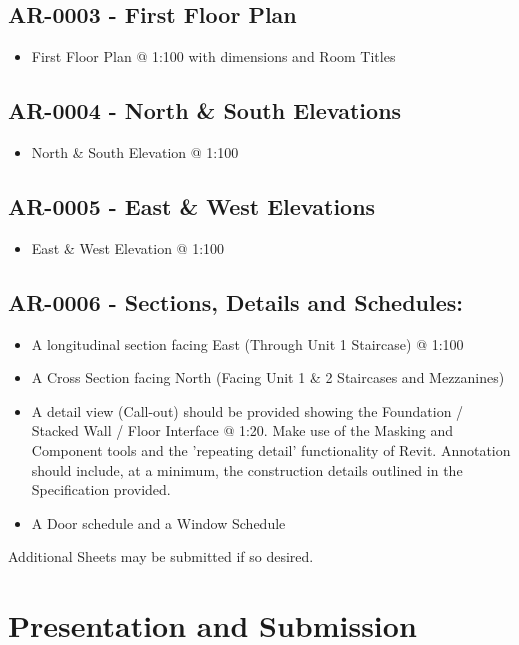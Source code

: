 \subsection*{AR-0003 - First Floor Plan}
\begin{itemize}
	\item First Floor Plan @ 1:100 with dimensions and Room Titles
\end{itemize}



\subsection*{AR-0004 - North \& South Elevations}
\begin{itemize}
	\item North \& South Elevation @ 1:100
\end{itemize}

\subsection*{AR-0005 - East \& West Elevations}
\begin{itemize}
	\item East \& West Elevation @ 1:100
\end{itemize}

\subsection*{AR-0006 - Sections, Details and Schedules:}
\begin{itemize}
	\item A longitudinal section facing East (Through Unit 1 Staircase) @ 1:100
	\item A Cross Section facing North (Facing Unit 1 \& 2 Staircases and Mezzanines)
	\item A detail view (Call-out) should be provided showing the Foundation / Stacked Wall / Floor Interface @ 1:20.  Make use of the Masking and Component tools and the 'repeating detail' functionality of Revit.  Annotation should include, at a minimum, the construction details outlined in the Specification provided.
	\item A Door schedule and a Window Schedule
\end{itemize}

Additional Sheets may be submitted if so desired.




\newpage
\section*{Presentation and Submission}


